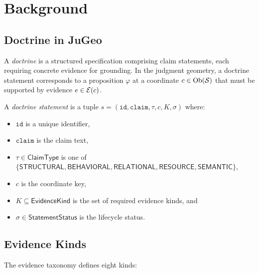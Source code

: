 \documentclass[11pt]{article}
\newcommand{\EvKind}{\mathsf{EvidenceKind}}
\newcommand{\ClmType}{\mathsf{ClaimType}}
\newcommand{\StmtStat}{\mathsf{StatementStatus}}
\begin{document}
\section{Background}\label{sec:bg}

\subsection{Doctrine in JuGeo}

A \emph{doctrine} is a structured specification comprising claim statements,
each requiring concrete evidence for grounding.  In the judgment geometry, a
doctrine statement corresponds to a proposition $\varphi$ at a coordinate
$c \in \mathrm{Ob}(\mathcal{S})$ that must be supported by evidence $e \in \mathcal{E}(c)$.

\begin{definition}\label{def:doctrine-stmt}
A \emph{doctrine statement} is a tuple $s = (\texttt{id}, \texttt{claim},
\tau, c, K, \sigma)$ where:
\begin{itemize}[leftmargin=2em]
  \item $\texttt{id}$ is a unique identifier,
  \item $\texttt{claim}$ is the claim text,
  \item $\tau \in \ClmType$ is one of $\{\mathsf{STRUCTURAL},
        \mathsf{BEHAVIORAL}, \mathsf{RELATIONAL}, \mathsf{RESOURCE},
        \mathsf{SEMANTIC}\}$,
  \item $c$ is the coordinate key,
  \item $K \subseteq \EvKind$ is the set of required evidence kinds, and
  \item $\sigma \in \StmtStat$ is the lifecycle status.
\end{itemize}
\end{definition}

\subsection{Evidence Kinds}

The evidence taxonomy defines eight kinds:
\end{document}
